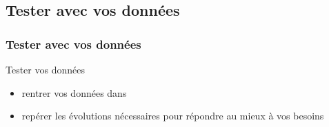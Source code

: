 \subsection{Tester avec vos données}
\begin{frame}
\frametitle{Tester avec vos données}

\begin{block}{}
\centering \Huge Tester vos données
\end{block}

\begin{itemize}
\item rentrer vos données dans \BDD
\item repérer les évolutions nécessaires pour répondre au mieux à vos besoins
\end{itemize}

\end{frame}

